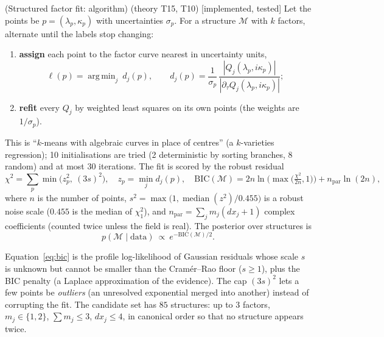 \documentclass[11pt,a4paper]{article}
\theoremstyle{definition}
\newcommand{\badge}[2]{\textcolor{#1}{\textsf{\footnotesize[#2]}}}
\newcommand{\impl}{\badge{cC}{implemented, tested}}
\newcommand{\thy}[1]{\textcolor{cG}{\textsf{\footnotesize(theory #1)}}}
\DeclareMathOperator*{\argmin}{arg\,min}
\begin{document}
\begin{theorem}{(Structured factor fit: algorithm) \thy{T15, T10} \impl}\label{thm:structfit}
Let the points be $p=(\lambda_p,\kappa_p)$ with uncertainties $\sigma_p$. For a structure $\mathcal M$ with $k$ factors, alternate until the labels stop changing:
\begin{enumerate}[nosep]
\item \textbf{assign} each point to the factor curve nearest in uncertainty units,
\[
\ell(p)=\argmin_j\ d_j(p),\qquad d_j(p)=\frac{1}{\sigma_p}\,\frac{|Q_j(\lambda_p,i\kappa_p)|}{|\partial_\tau Q_j(\lambda_p,i\kappa_p)|};
\]
\item \textbf{refit} every $Q_j$ by weighted least squares on its own points (the weights are $1/\sigma_p$).
\end{enumerate}
This is ``$k$-means with algebraic curves in place of centres'' (a $k$-varieties regression); 10 initialisations are tried (2 deterministic by sorting branches, 8 random) and at most 30 iterations. The fit is scored by the robust residual
\begin{equation}\label{eq:bic}
\chi^2=\sum_p\min\big(z_p^2,\ (3s)^2\big),\quad z_p=\min_jd_j(p),\quad
\mathrm{BIC}(\mathcal M)=2n\ln\!\Big(\max\Big(\tfrac{\chi^2}{2n},1\Big)\Big)+n_{\mathrm{par}}\ln(2n),
\end{equation}
where $n$ is the number of points, $s^2=\max\big(1,\operatorname{median}(z^2)/0.455\big)$ is a robust noise scale ($0.455$ is the median of $\chi^2_1$), and $n_{\mathrm{par}}=\sum_jm_j(dx_j+1)$ complex coefficients (counted twice unless the field is real). The posterior over structures is
\begin{equation}\label{eq:postM}
p(\mathcal M\mid\text{data})\ \propto\ e^{-\mathrm{BIC}(\mathcal M)/2}.
\end{equation}
\end{theorem}
\begin{intuition}
Equation~\eqref{eq:bic} is the profile log-likelihood of Gaussian residuals whose scale $s$ is unknown but cannot be smaller than the Cram\'er--Rao floor ($s\ge1$), plus the BIC penalty (a Laplace approximation of the evidence). The cap $(3s)^2$ lets a few points be \emph{outliers} (an unresolved exponential merged into another) instead of corrupting the fit. The candidate set has $85$ structures: up to $3$ factors, $m_j\in\{1,2\}$, $\sum m_j\le3$, $dx_j\le4$, in canonical order so that no structure appears twice.
\end{intuition}
\end{document}
